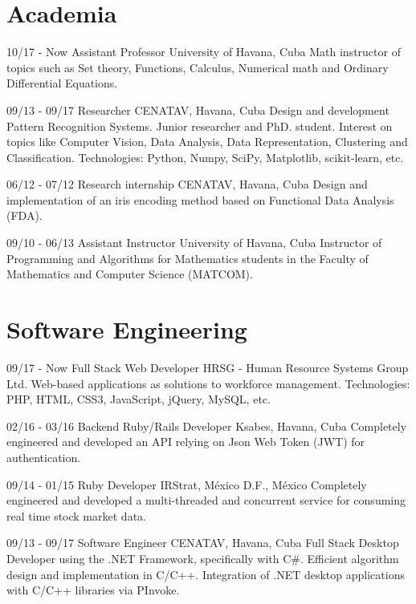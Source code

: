 \documentclass[]{friggeri-cv}
\begin{document}
\section{Academia}
\begin{entrylist}
  \entry
    {10/17 - Now}
    {Assistant Professor}
    {University of Havana, Cuba}
    {Math instructor of topics such as Set theory, Functions, Calculus, Numerical math and Ordinary Differential Equations.\\}
  
  \entry
    {09/13 - 09/17}
    {Researcher}
    {CENATAV, Havana, Cuba}
    {Design and development Pattern Recognition Systems. Junior researcher and PhD. student. Interest on topics like Computer Vision, Data Analysis, Data Representation, Clustering and Classification. Technologies: Python, Numpy, SciPy, Matplotlib, scikit-learn, etc.\\}
    
  \entry
    {06/12 - 07/12}
    {Research internship}
    {CENATAV, Havana, Cuba}
    {Design and implementation of an iris encoding method based on Functional Data Analysis (FDA).\\}
    
  \entry
    {09/10 - 06/13}
    {Assistant Instructor}
    {University of Havana, Cuba}
    {Instructor of Programming and Algorithms for Mathematics students in the Faculty of Mathematics and Computer Science (MATCOM).\\}
\end{entrylist}

\section{Software Engineering}
\begin{entrylist}
  \entry
    {09/17 - Now}
    {Full Stack Web Developer}
    {HRSG - Human Resource Systems Group Ltd.}
    {Web-based applications as solutions to workforce management. Technologies: PHP, HTML, CSS3, JavaScript, jQuery, MySQL, etc.\\} 
  
  \entry
    {02/16 - 03/16}
    {Backend Ruby/Rails Developer}
    {Ksabes, Havana, Cuba}
    {Completely engineered and developed an API relying on Json Web Token (JWT) for authentication.\\}
  
  \entry
    {09/14 - 01/15}
    {Ruby Developer}
    {IRStrat, México D.F., México}
    {Completely engineered and developed a multi-threaded and concurrent service for consuming real time stock market data.\\}

  \entry
    {09/13 - 09/17}
    {Software Engineer}
    {CENATAV, Havana, Cuba}
    {Full Stack Desktop Developer using the .NET Framework, specifically with C\#. Efficient algorithm design and implementation in C/C++. Integration of .NET desktop applications with C/C++ libraries via PInvoke.\\}
\end{entrylist}
\end{document}
